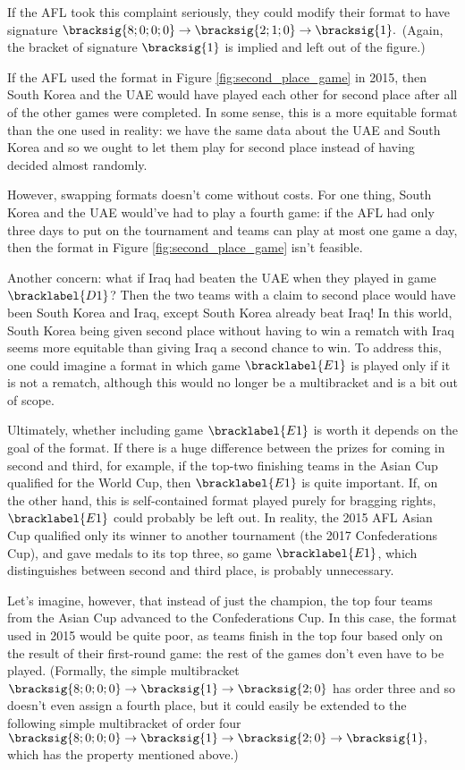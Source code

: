 {    If the AFL took this complaint seriously, they could modify their format to have signature $\bracksig{8;0;0;0} \to \bracksig{2; 1; 0} \to \bracksig{1}.$ (Again, the bracket of signature $\bracksig{1}$ is implied and left out of the figure.)
    

    If the AFL used the format in Figure \ref{fig:second_place_game} in 2015, then South Korea and the UAE would have played each other for second place after all of the other games were completed. In some sense, this is a more equitable format than the one used in reality: we have the same data about the UAE and South Korea and so we ought to let them play for second place instead of having decided almost randomly.

    However, swapping formats doesn't come without costs. For one thing, South Korea and the UAE would've had to play a fourth game: if the AFL had only three days to put on the tournament and teams can play at most one game a day, then the format in Figure \ref{fig:second_place_game} isn't feasible.

    Another concern: what if Iraq had beaten the UAE when they played in game $\bracklabel{D1}$? Then the two teams with a claim to second place would have been South Korea and Iraq, except South Korea already beat Iraq! In this world, South Korea being given second place without having to win a rematch with Iraq seems more equitable than giving Iraq a second chance to win. To address this, one could imagine a format in which game $\bracklabel{E1}$ is played only if it is not a rematch, although this would no longer be a multibracket and is a bit out of scope.

    Ultimately, whether including game $\bracklabel{E1}$ is worth it depends on the goal of the format. If there is a huge difference between the prizes for coming in second and third, for example, if the top-two finishing teams in the Asian Cup qualified for the World Cup, then $\bracklabel{E1}$ is quite important. If, on the other hand, this is self-contained format played purely for bragging rights, $\bracklabel{E1}$ could probably be left out. In reality, the 2015 AFL Asian Cup qualified only its winner to another tournament (the 2017 Confederations Cup), and gave medals to its top three, so game $\bracklabel{E1}$, which distinguishes between second and third place, is probably unnecessary.

    Let's imagine, however, that instead of just the champion, the top four teams from the Asian Cup advanced to the Confederations Cup. In this case, the format used in 2015 would be quite poor, as teams finish in the top four based only on the result of their first-round game: the rest of the games don't even have to be played. (Formally, the simple multibracket $\bracksig{8;0;0;0} \to \bracksig{1} \to \bracksig{2; 0}$ has order three and so doesn't even assign a fourth place, but it could easily be extended to the following simple multibracket of order four $\bracksig{8;0;0;0} \to \bracksig{1} \to \bracksig{2; 0} \to \bracksig{1},$ which has the property mentioned above.)
    
}
